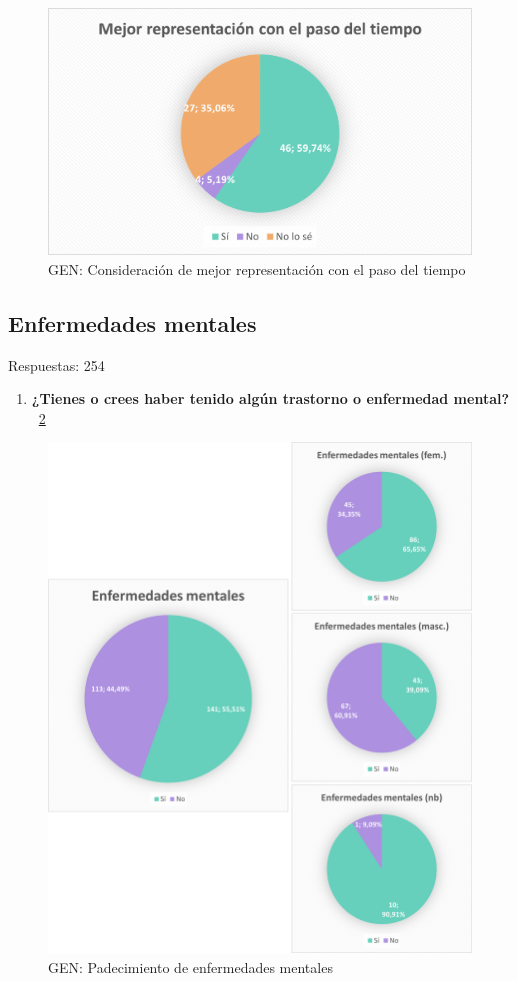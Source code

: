 \documentclass[12pt, a4paper,twoside,titlepage]{book}
\begin{document}
\begin{figure}
    \centering
    \includegraphics[width=.8\linewidth]{ANEXO Gen/20AnexGENMejor}
    \caption{GEN: Consideración de mejor representación con el paso del tiempo}
    \label{fig:GENMejor}
\end{figure}




\subsection{Enfermedades mentales}
Respuestas: 254
\begin{enumerate}[label=\textbf{\arabic*}.]
     \item \textbf{¿Tienes o crees haber tenido algún trastorno o enfermedad mental? }\\
    ~\ref{fig:GENEnf}
\end{enumerate}


\begin{figure}
    \centering
    \includegraphics[width=1\linewidth]{ANEXO Gen/21AnexGENEnf}
    \caption{GEN: Padecimiento de enfermedades mentales}
    \label{fig:GENEnf}
\end{figure}
\end{document}
